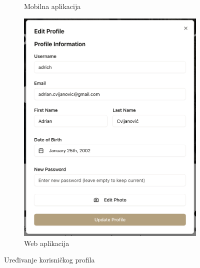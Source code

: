 \begin{figure}[H]
\begin{subfigure}[b]{0.35\textwidth}
        \caption{Mobilna aplikacija}
        \label{fig:uredjivanje_profila_mob}
    \end{subfigure}
    \hfill
    \begin{subfigure}[b]{0.55\textwidth}
        \centering
        \includegraphics[width=\textwidth]{images/implementacija/web/editing-options/edit-user.png}
        \caption{Web aplikacija}
        \label{fig:uredjivanje_profila_web}
    \end{subfigure}
    \caption{Uređivanje korisničkog profila}
    \label{fig:uredjivanje_profila}
\end{figure}